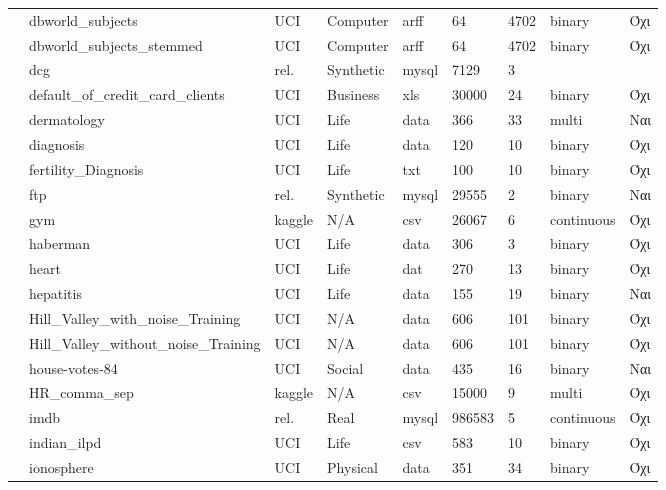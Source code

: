 {\begin{longtable}{|l| l| l | l | l | l |l | l | l | }
 							\rownumber & dbworld\_subjects & UCI & Computer & arff & 64 & 4702 & binary & Όχι \\
 							\rownumber & dbworld\_subjects\_stemmed & UCI & Computer & arff & 64 & 4702 & binary & Όχι \\
 							\rownumber & dcg \citep{dcg} & rel. & Synthetic & mysql & 7129 & 3 & & \\
 							\rownumber & default\_of\_credit\_card\_clients \citep{default} & UCI & Business & xls & 30000 & 24 & binary & Όχι \\
 							\rownumber & dermatology \citep{dermatology} & UCI & Life & data & 366 & 33 & multi & Ναι \\
 							\rownumber & diagnosis\citep{Czerniak2003} & UCI & Life &data & 120 &10 & binary & Όχι \\
 							\rownumber & fertility\_Diagnosis & UCI & Life & txt & 100 & 10 & binary & Όχι \\
 							\rownumber & ftp \citep{ftp} & rel. & Synthetic & mysql & 29555  & 2 & binary  & Ναι  \\
 							\rownumber & gym \citep{gym} & kaggle & N/A & csv & 26067 & 6 & continuous & Όχι \\
 							\rownumber & haberman \citep{haberman} & UCI & Life & data &  306 & 3 & binary & Όχι \\
 							\rownumber & heart\citep{heart} & UCI & Life &dat & 270&13 &binary & Όχι \\
 							\rownumber & hepatitis \citep{hepatitis} & UCI & Life & data & 155 & 19 & binary & Ναι \\
 							\rownumber & Hill\_Valley\_with\_noise\_Training & UCI & N/A & data & 606 & 101 & binary & Όχι \\
 							\rownumber & Hill\_Valley\_without\_noise\_Training & UCI & N/A & data & 606 & 101 & binary & Όχι \\
 							\rownumber & house-votes-84 & UCI & Social & data & 435 & 16  & binary & Ναι  \\
 							\rownumber & HR\_comma\_sep \citep{hr} & kaggle & N/A & csv & 15000 & 9 & multi & Όχι \\
 							\rownumber & imdb \citep{imdb} & rel. & Real & mysql & 986583 & 5 & continuous & Όχι \\
 							\rownumber & indian\_ilpd & UCI & Life & csv & 583 & 10 & binary & Όχι \\
 							\rownumber & ionosphere \citep{ionoshpere} & UCI & Physical & data  & 351 & 34  &  binary & Όχι \\

\end{longtable}}
